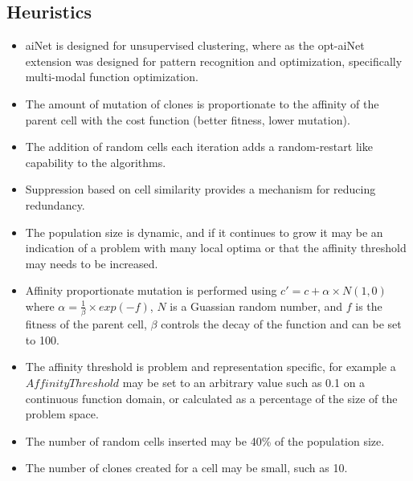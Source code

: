 \subsection{Heuristics}
\begin{itemize}
	\item aiNet is designed for unsupervised clustering, where as the opt-aiNet extension was designed for pattern recognition and optimization, specifically multi-modal function optimization.
	\item The amount of mutation of clones is proportionate to the affinity of the parent cell with the cost function (better fitness, lower mutation).
	\item The addition of random cells each iteration adds a random-restart like capability to the algorithms.
	\item Suppression based on cell similarity provides a mechanism for reducing redundancy.
	\item The population size is dynamic, and if it continues to grow it may be an indication of a problem with many local optima or that the affinity threshold may needs to be increased.
	\item Affinity proportionate mutation is performed using $c\prime = c + \alpha \times N(1,0)$ where $\alpha = \frac{1}{\beta} \times exp(-f)$, $N$ is a Guassian random number, and $f$ is the fitness of the parent cell, $\beta$ controls the decay of the function and can be set to 100. 
	\item The affinity threshold is problem and representation specific, for example a $AffinityThreshold$ may be set to an arbitrary value such as 0.1 on a continuous function domain, or calculated as a percentage of the size of the problem space.
	\item The number of random cells inserted may be 40\% of the population size. 
	\item The number of clones created for a cell may be small, such as 10.
\end{itemize}

